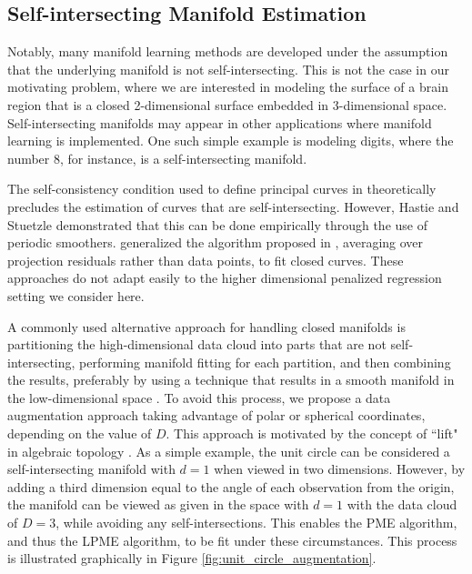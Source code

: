 \documentclass[12pt]{article}
\theoremstyle{definition}
\begin{document}
\subsection{Self-intersecting Manifold Estimation}\label{ss:selfInt}

Notably, many manifold learning methods are developed under the assumption that the underlying manifold is not self-intersecting. This is not the case in our motivating problem, where we are interested in modeling the surface of a brain region that is a closed 2-dimensional surface embedded in 3-dimensional space. Self-intersecting manifolds may appear in other applications where manifold learning is implemented. One such simple example is modeling digits, where the number 8, for instance, is a self-intersecting manifold.

The self-consistency condition used to define principal curves in \cite{hastie1989Principal} theoretically precludes the estimation of curves that are self-intersecting. However, Hastie and Stuetzle demonstrated that this can be done empirically through the use of periodic smoothers. \cite{banfieldIceFloeIdentification1992} generalized the algorithm proposed in \cite{hastie1989Principal}, averaging over projection residuals rather than data points, to fit closed curves. These approaches do not adapt easily to the higher dimensional penalized regression setting we consider here.

A commonly used alternative approach for handling closed manifolds is partitioning the high-dimensional data cloud into parts that are not self-intersecting, performing manifold fitting for each partition, and then combining the results, preferably by using a technique that results in a smooth manifold in the low-dimensional space \citep[e.g.][]{meng2021Principal}. To avoid this process, we propose a data augmentation approach taking advantage of polar or spherical coordinates, depending on the value of $D$. This approach is motivated by the concept of ``lift" in algebraic topology \citep[sec. 1.1]{hatcher2002algebraic}. As a simple example, the unit circle can be considered a self-intersecting manifold with $d = 1$ when viewed in two dimensions. However, by adding a third dimension equal to the angle of each observation from the origin, the manifold can be viewed as given in the space with $d = 1$ with the data cloud of $D = 3$, while avoiding any self-intersections. This enables the PME algorithm, and thus the LPME algorithm, to be fit under these circumstances. This process is illustrated graphically in Figure \ref{fig:unit_circle_augmentation}.
\end{document}
